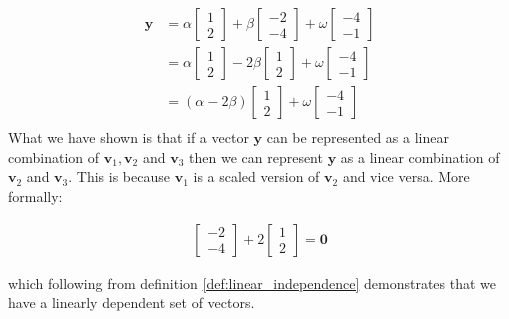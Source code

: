 \documentclass[a4paper,12pt]{book}
\newcommand{\vectr}[1]{\textbf{#1}}
\begin{document}
	\begin{align}
		\vectr{y} &= \alpha \begin{bmatrix} 1 \\ 2 \end{bmatrix} + \beta \begin{bmatrix} -2 \\ -4 \end{bmatrix} + \omega \begin{bmatrix} -4 \\ -1 \end{bmatrix} \\
		&= \alpha \begin{bmatrix} 1 \\ 2 \end{bmatrix} - 2\beta \begin{bmatrix} 1 \\ 2 \end{bmatrix} + \omega \begin{bmatrix} -4 \\ -1 \end{bmatrix} \\
		&= (\alpha - 2\beta) \begin{bmatrix} 1 \\ 2 \end{bmatrix} + \omega \begin{bmatrix} -4 \\ -1 \end{bmatrix} \\
	\end{align} 
	What we have shown is that if a vector $ \vectr{y} $ can be represented as a linear combination of $ \vectr{v}_1,\vectr{v}_2 $ and $ \vectr{v}_3 $ then we can represent $ \vectr{y} $ as a linear combination of $ \vectr{v}_2 $ and $ \vectr{v}_3 $. This is because $ \vectr{v}_1 $ is a scaled version of $ \vectr{v}_2 $ and vice versa. 
	More formally:
	
	\begin{align}
		\begin{bmatrix} -2 \\ -4 \end{bmatrix} + 2 \begin{bmatrix} 1 \\ 2 \end{bmatrix} = \vectr{0}
	\end{align}
	
	which following from definition \ref{def:linear_independence} demonstrates that we have a linearly dependent set of vectors.
\end{document}
